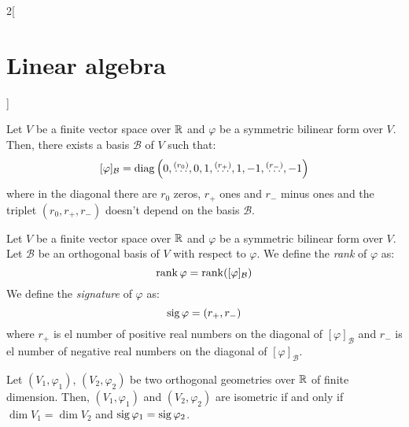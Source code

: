 \documentclass[../../../main_math.tex]{subfiles}
\begin{document}
\begin{multicols}{2}[\section{Linear algebra}]
\begin{theorem}
    Let $V$ be a finite vector space over $\mathbb{R}$ and $\varphi$ be a symmetric bilinear form over $V$. Then, there exists a basis $\mathcal{B}$ of $V$ such that:
    $$[\varphi]_\mathcal{B}=\operatorname{diag}\left(0,\overset{(r_0)}{\ldots},0,1,\overset{(r_+)}{\ldots},1,-1,\overset{(r_-)}{\ldots},-1\right)$$
    where in the diagonal there are $r_0$ zeros, $r_+$ ones and $r_-$ minus ones and the triplet $(r_0,r_+,r_-)$ doesn't depend on the basis $\mathcal{B}$.
  \end{theorem}
  \begin{definition}
    Let $V$ be a finite vector space over $\mathbb{R}$ and $\varphi$ be a symmetric bilinear form over $V$. Let $\mathcal{B}$ be an orthogonal basis of $V$ with respect to $\varphi$. We define the \emph{rank} of $\varphi$ as: $$\rank \varphi=\rank ([\varphi]_\mathcal{B})$$ We define the \emph{signature} of $\varphi$ as: $$\operatorname{sig}\varphi=(r_+,r_-)$$ where $r_+$ is el number of positive real numbers on the diagonal of $[\varphi]_\mathcal{B}$ and $r_-$ is el number of negative real numbers on the diagonal of $[\varphi]_\mathcal{B}$.
  \end{definition}
  \begin{theorem}
    Let $(V_1,\varphi_1)$, $(V_2,\varphi_2)$ be two orthogonal geometries over $\mathbb{R}$ of finite dimension. Then, $(V_1,\varphi_1)$ and $(V_2,\varphi_2)$ are isometric if and only if $\dim V_1=\dim V_2$ and $\operatorname{sig} \varphi_1=\operatorname{sig} \varphi_2$.
  \end{theorem}

\end{multicols}
\end{document}
